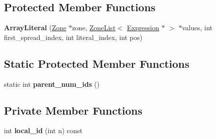 \subsection*{Protected Member Functions}
\begin{DoxyCompactItemize}
\item 
{\bfseries Array\+Literal} (\hyperlink{classv8_1_1internal_1_1_zone}{Zone} $\ast$zone, \hyperlink{classv8_1_1internal_1_1_zone_list}{Zone\+List}$<$ \hyperlink{classv8_1_1internal_1_1_expression}{Expression} $\ast$ $>$ $\ast$values, int first\+\_\+spread\+\_\+index, int literal\+\_\+index, int pos)\hypertarget{classv8_1_1internal_1_1_array_literal_aa525ecda43e041b8dff9a504400a6437}{}\label{classv8_1_1internal_1_1_array_literal_aa525ecda43e041b8dff9a504400a6437}

\end{DoxyCompactItemize}
\subsection*{Static Protected Member Functions}
\begin{DoxyCompactItemize}
\item 
static int {\bfseries parent\+\_\+num\+\_\+ids} ()\hypertarget{classv8_1_1internal_1_1_array_literal_a4bfbb3f6dab028be8ba70ecf40e7b4fc}{}\label{classv8_1_1internal_1_1_array_literal_a4bfbb3f6dab028be8ba70ecf40e7b4fc}

\end{DoxyCompactItemize}
\subsection*{Private Member Functions}
\begin{DoxyCompactItemize}
\item 
int {\bfseries local\+\_\+id} (int n) const \hypertarget{classv8_1_1internal_1_1_array_literal_acd2ba950618da3d583e5e66becc4f28e}{}\label{classv8_1_1internal_1_1_array_literal_acd2ba950618da3d583e5e66becc4f28e}

\end{DoxyCompactItemize}
